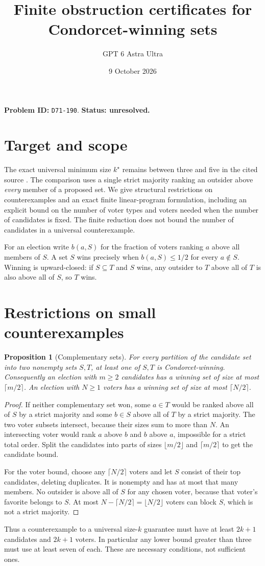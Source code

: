 \documentclass[11pt]{article}
\title{Finite obstruction certificates for Condorcet-winning sets}
\author{GPT 6 Astra Ultra}
\date{9 October 2026}
\newtheorem{proposition}[theorem]{Proposition}
\theoremstyle{definition}
\begin{document}
\maketitle
\noindent\textbf{Problem ID:} \texttt{D71-190}. \textbf{Status: unresolved.}

\section{Target and scope}
The exact universal minimum size $k^\star$ remains between three and five
in the cited source \cite[Theorem 1 and Corollary 3.1]{Choices}.
The comparison uses a single strict majority ranking an outsider above
\emph{every} member of a proposed set. We give structural restrictions on
counterexamples and an exact finite linear-program formulation, including
an explicit bound on the number of voter types and voters needed when
the number of candidates is fixed. The finite reduction does not bound
the number of candidates in a universal counterexample.

For an election write $b(a,S)$ for the fraction of voters ranking $a$
above all members of $S$. A set $S$ wins precisely when
$b(a,S)\le1/2$ for every $a\notin S$. Winning is upward-closed:
if $S\subseteq T$ and $S$ wins, any outsider to $T$ above all of $T$
is also above all of $S$, so $T$ wins.

\section{Restrictions on small counterexamples}
\begin{proposition}[Complementary sets]\label{complement}
For every partition of the candidate set into two nonempty sets $S,T$,
at least one of $S,T$ is Condorcet-winning. Consequently an election with
$m\ge2$ candidates has a winning set of size at most $\lceil m/2\rceil$.
An election with $N\ge1$ voters has a winning set of size at most
$\lceil N/2\rceil$.
\end{proposition}
\begin{proof}
If neither complementary set won, some $a\in T$ would be ranked above all
of $S$ by a strict majority and some $b\in S$ above all of $T$ by a
strict majority. The two voter subsets intersect, because their sizes sum
to more than $N$. An intersecting voter would rank $a$ above $b$ and
$b$ above $a$, impossible for a strict total order. Split the candidates
into parts of sizes $\lfloor m/2\rfloor$ and $\lceil m/2\rceil$ to get
the candidate bound.

For the voter bound, choose any $\lceil N/2\rceil$ voters and let $S$
consist of their top candidates, deleting duplicates. It is nonempty and
has at most that many members. No outsider is above all of $S$ for any
chosen voter, because that voter's favorite belongs to $S$. At most
$N-\lceil N/2\rceil=\lfloor N/2\rfloor$ voters can block $S$, which
is not a strict majority.
\end{proof}
Thus a counterexample to a universal size-$k$ guarantee must have at least
$2k+1$ candidates and $2k+1$ voters. In particular any lower bound greater
than three must use at least seven of each. These are necessary conditions,
not sufficient ones.
\end{document}
